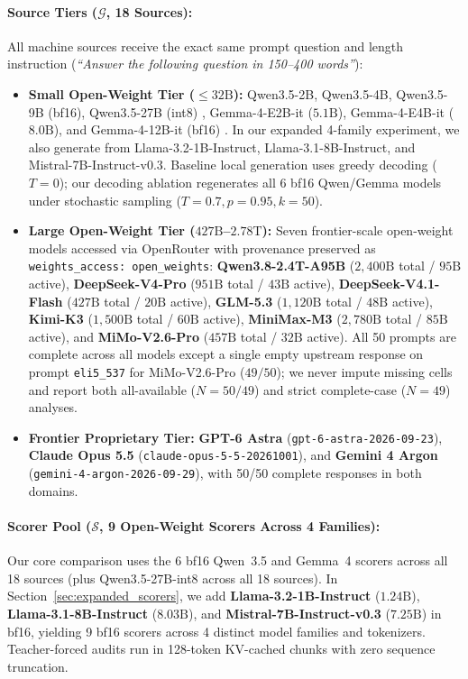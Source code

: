 \documentclass[11pt,a4paper,twocolumn]{article}
\begin{document}
\paragraph{Source Tiers ($\mathcal{G}$, 18 Sources):}
All machine sources receive the exact same prompt question and length instruction (\emph{``Answer the following question in 150--400 words''}):
\begin{itemize}
    \item \textbf{Small Open-Weight Tier ($\le 32\text{B}$):} Qwen3.5-2B, Qwen3.5-4B, Qwen3.5-9B (bf16), Qwen3.5-27B (int8) \cite{qwen2026}, Gemma-4-E2B-it ($5.1\text{B}$), Gemma-4-E4B-it ($8.0\text{B}$), and Gemma-4-12B-it (bf16) \cite{gemma2026}. In our expanded 4-family experiment, we also generate from Llama-3.2-1B-Instruct, Llama-3.1-8B-Instruct, and Mistral-7B-Instruct-v0.3. Baseline local generation uses greedy decoding ($T=0$); our decoding ablation regenerates all 6 bf16 Qwen/Gemma models under stochastic sampling ($T=0.7, p=0.95, k=50$).
    \item \textbf{Large Open-Weight Tier ($427\text{B}$--$2.78\text{T}$):} Seven frontier-scale open-weight models accessed via OpenRouter with provenance preserved as \texttt{weights\_access: open\_weights}: \textbf{Qwen3.8-2.4T-A95B} ($2{,}400\text{B}$ total / $95\text{B}$ active), \textbf{DeepSeek-V4-Pro} ($951\text{B}$ total / $43\text{B}$ active), \textbf{DeepSeek-V4.1-Flash} ($427\text{B}$ total / $20\text{B}$ active), \textbf{GLM-5.3} ($1{,}120\text{B}$ total / $48\text{B}$ active), \textbf{Kimi-K3} ($1{,}500\text{B}$ total / $60\text{B}$ active), \textbf{MiniMax-M3} ($2{,}780\text{B}$ total / $85\text{B}$ active), and \textbf{MiMo-V2.6-Pro} ($457\text{B}$ total / $32\text{B}$ active). All 50 prompts are complete across all models except a single empty upstream response on prompt \texttt{eli5\_537} for MiMo-V2.6-Pro ($49/50$); we never impute missing cells and report both all-available ($N=50/49$) and strict complete-case ($N=49$) analyses.
    \item \textbf{Frontier Proprietary Tier:} \textbf{GPT-6 Astra} (\texttt{gpt-6-astra-2026-09-23}), \textbf{Claude Opus 5.5} (\texttt{claude-opus-5-5-20261001}), and \textbf{Gemini 4 Argon} (\texttt{gemini-4-argon-2026-09-29}), with 50/50 complete responses in both domains.
\end{itemize}

\paragraph{Scorer Pool ($\mathcal{S}$, 9 Open-Weight Scorers Across 4 Families):}
Our core comparison uses the 6 bf16 Qwen~3.5 and Gemma~4 scorers across all 18 sources (plus Qwen3.5-27B-int8 across all 18 sources). In Section~\ref{sec:expanded_scorers}, we add \textbf{Llama-3.2-1B-Instruct} ($1.24\text{B}$), \textbf{Llama-3.1-8B-Instruct} ($8.03\text{B}$), and \textbf{Mistral-7B-Instruct-v0.3} ($7.25\text{B}$) in bf16, yielding 9 bf16 scorers across 4 distinct model families and tokenizers. Teacher-forced audits run in 128-token KV-cached chunks with zero sequence truncation.
\end{document}
